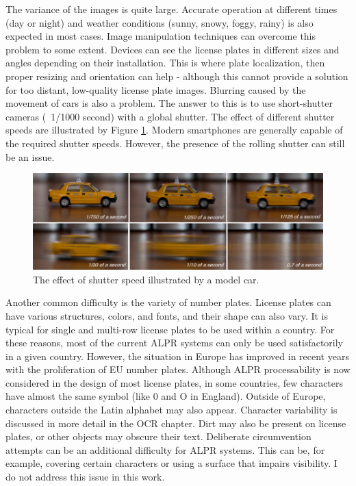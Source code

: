 The variance of the images is quite large. Accurate operation at different times (day or night) and weather conditions (sunny, snowy, foggy, rainy) is also expected in most cases. Image manipulation techniques can overcome this problem to some extent. Devices can see the license plates in different sizes and angles depending on their installation. This is where plate localization, then proper resizing and orientation can help - although this cannot provide a solution for too distant, low-quality license plate images. Blurring caused by the movement of cars is also a problem. The answer to this is to use short-shutter cameras (~1/1000 second) with a global shutter. The effect of different shutter speeds are illustrated by Figure \ref{fig:shutter-speed}. Modern smartphones are generally capable of the required shutter speeds. However, the presence of the rolling shutter can still be an issue.

\begin{figure}[htb]
 \centerline{\includegraphics[width=1.0\columnwidth]{.//Figure/ALPR/shutter-speed.png}}
 \caption{The effect of shutter speed illustrated by a model car\cite{ShutterEffect}.}
 \label{fig:shutter-speed}
\end{figure}

Another common difficulty is the variety of number plates. License plates can have various structures, colors, and fonts, and their shape can also vary. It is typical for single and multi-row license plates to be used within a country. For these reasons, most of the current ALPR systems can only be used satisfactorily in a given country. However, the situation in Europe has improved in recent years with the proliferation of EU number plates. Although ALPR processability is now considered in the design of most license plates, in some countries, few characters have almost the same symbol (like 0 and O in England). Outside of Europe, characters outside the Latin alphabet may also appear. Character variability is discussed in more detail in the OCR chapter. Dirt may also be present on license plates, or other objects may obscure their text. Deliberate circumvention attempts can be an additional difficulty for ALPR systems. This can be, for example, covering certain characters or using a surface that impairs visibility. I do not address this issue in this work.
\newpage

